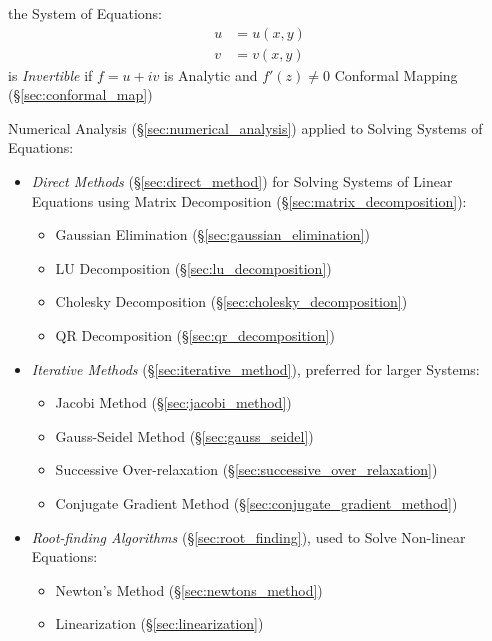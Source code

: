 
the System of Equations:
\begin{align*}
  u & = u(x,y) \\
  v & = v(x,y)
\end{align*}
is \emph{Invertible} if $f = u + iv$ is Analytic and $f'(z) \neq 0$ \fist
Conformal Mapping (\S\ref{sec:conformal_map})

Numerical Analysis (\S\ref{sec:numerical_analysis}) applied to Solving Systems
of Equations:
\begin{itemize}
  \item \emph{Direct Methods} (\S\ref{sec:direct_method}) for Solving Systems of
    Linear Equations using Matrix Decomposition
    (\S\ref{sec:matrix_decomposition}):
    \begin{itemize}
      \item Gaussian Elimination (\S\ref{sec:gaussian_elimination})
      \item LU Decomposition (\S\ref{sec:lu_decomposition})
      \item Cholesky Decomposition (\S\ref{sec:cholesky_decomposition})
      \item QR Decomposition (\S\ref{sec:qr_decomposition})
    \end{itemize}
  \item \emph{Iterative Methods} (\S\ref{sec:iterative_method}), preferred for
    larger Systems:
    \begin{itemize}
      \item Jacobi Method (\S\ref{sec:jacobi_method})
      \item Gauss-Seidel Method (\S\ref{sec:gauss_seidel})
      \item Successive Over-relaxation (\S\ref{sec:successive_over_relaxation})
      \item Conjugate Gradient Method (\S\ref{sec:conjugate_gradient_method})
    \end{itemize}
  \item \emph{Root-finding Algorithms} (\S\ref{sec:root_finding}), used to
    Solve Non-linear Equations:
    \begin{itemize}
      \item Newton's Method (\S\ref{sec:newtons_method})
      \item Linearization (\S\ref{sec:linearization})
    \end{itemize}
\end{itemize}



